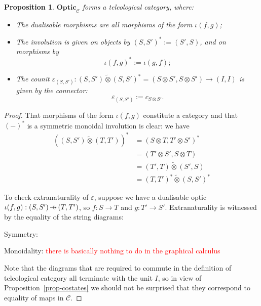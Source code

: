 \documentclass[11pt,a4paper]{article}
\theoremstyle{plain}
\newtheorem{proposition}[theorem]{Proposition}
\theoremstyle{definition}
\newcommand{\C}{\mathscr{C}}
\newcommand{\Optic}{\mathbf{Optic}}
\newcommand{\switched}{\mathbin{\tilde{\otimes}}}
\newcommand{\hto}{\ensuremath{\,\mathaccent\shortmid\rightarrow\,}}
\newcommand{\todo}[1]{\textcolor{red}{\small #1}}
\begin{document}
\begin{proposition}
  $\Optic_\C$ forms a teleological category, where:
  \begin{itemize}
  \item The dualisable morphisms are all morphisms of the form $\iota(f, g)$;
  \item The involution is given on objects by ${(S, S')}^* := (S', S)$, and on morphisms by \[\iota{(f, g)}^* := \iota(g, f);\]
  \item The counit $\varepsilon_{(S, S')} : (S, S') \switched {(S, S')}^* = (S \otimes S', S \otimes S') \to (I, I)$ is given by the connector: \[\varepsilon_{(S, S')} := c_{S \otimes S'}.\]
  \end{itemize}
\end{proposition}
\begin{proof}
  That morphisms of the form $\iota(f, g)$ constitute a category and that ${(-)}^*$ is a symmetric monoidal involution is clear: we have
  \begin{align*}
    \left( (S, S') \switched (T, T') \right)^*
    &= \left( S \otimes T, T' \otimes S' \right)^* \\
    &= \left(T' \otimes S', S \otimes T  \right) \\
    &= (T', T) \switched (S', S) \\
    &= (T, T')^* \switched (S, S')^*
  \end{align*}

  To check extranaturality of $\varepsilon$, suppose we have a dualisable optic $\iota(f, g) : (S, S') \hto (T, T')$, so $f : S \to T$ and $g : T' \to S'$. Extranaturality is witnessed by the equality of the string diagrams:
  \begin{center}
    
    \qquad \raisebox{1.5cm}{$=$} \qquad
    
  \end{center}
  Symmetry:
  \begin{center}
    
    \qquad \raisebox{1.5cm}{$=$} \qquad
    
  \end{center}
  Monoidality: \todo{there is basically nothing to do in the graphical calculus}

  Note that the diagrams that are required to commute in the definition of teleological category all terminate with the unit $I$, so in view of Proposition~\ref{prop-costates} we should not be surprised that they correspond to equality of maps in $\C$.
\end{proof}
\end{document}
